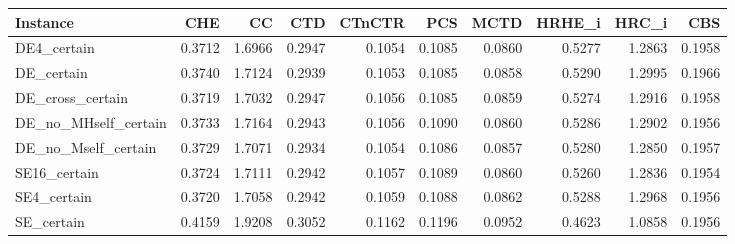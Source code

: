 \begin{tabular}{lrrrrrrrrr}
\toprule
Instance & CHE & CC & CTD & CTnCTR & PCS & MCTD & HRHE_i & HRC_i & CBS \\
\midrule
DE4_certain & 0.3712 & 1.6966 & 0.2947 & 0.1054 & 0.1085 & 0.0860 & 0.5277 & 1.2863 & 0.1958 \\
DE_certain & 0.3740 & 1.7124 & 0.2939 & 0.1053 & 0.1085 & 0.0858 & 0.5290 & 1.2995 & 0.1966 \\
DE_cross_certain & 0.3719 & 1.7032 & 0.2947 & 0.1056 & 0.1085 & 0.0859 & 0.5274 & 1.2916 & 0.1958 \\
DE_no_MHself_certain & 0.3733 & 1.7164 & 0.2943 & 0.1056 & 0.1090 & 0.0860 & 0.5286 & 1.2902 & 0.1956 \\
DE_no_Mself_certain & 0.3729 & 1.7071 & 0.2934 & 0.1054 & 0.1086 & 0.0857 & 0.5280 & 1.2850 & 0.1957 \\
SE16_certain & 0.3724 & 1.7111 & 0.2942 & 0.1057 & 0.1089 & 0.0860 & 0.5260 & 1.2836 & 0.1954 \\
SE4_certain & 0.3720 & 1.7058 & 0.2942 & 0.1059 & 0.1088 & 0.0862 & 0.5288 & 1.2968 & 0.1956 \\
SE_certain & 0.4159 & 1.9208 & 0.3052 & 0.1162 & 0.1196 & 0.0952 & 0.4623 & 1.0858 & 0.1956 \\
\bottomrule
\end{tabular}

